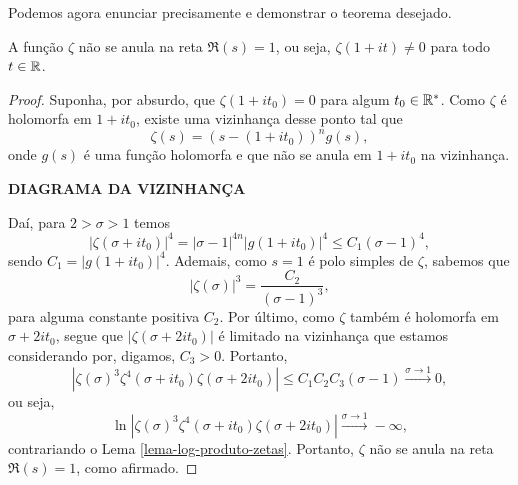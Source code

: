     \medskip
    
    
    Podemos agora enunciar precisamente e demonstrar o teorema desejado.
    \begin{teorema}
    \label{teo-zeta-nao-nula-re1}
        A função $\zeta$ não se anula na reta $\Re(s) = 1$, ou seja,
        $\zeta(1 + it) \neq 0$ para todo $t\in\mathbb{R}$.
    \end{teorema}
    \begin{proof}
        Suponha, por absurdo, que $\zeta(1 + it_0) = 0$ para algum 
        $t_0\in\mathbb{R}^*$. Como $\zeta$ é holomorfa em $1 + it_0$, existe
        uma vizinhança desse ponto tal que
        \[
        \zeta(s) = (s - (1 + it_0))^n g(s),
        \]
        onde $g(s)$ é uma função holomorfa e que não se anula em $1 + it_0$
        na vizinhança. 
        \begin{center}
            {\bf DIAGRAMA DA VIZINHANÇA}
        \end{center}
        Daí, para $2 > \sigma > 1$ temos
        \[
        |\zeta(\sigma + it_0)|^4 = |\sigma-1|^{4n}|g(1 + it_0)|^4
                                 \leq C_1(\sigma-1)^4,
        \]
        sendo $C_1 = |g(1+it_0)|^4$. Ademais, como $s=1$ é polo simples
        de $\zeta$, sabemos que
        \[
        |\zeta(\sigma)|^3 = \frac{C_2}{(\sigma - 1)^3},
        \]
        para alguma constante positiva $C_2$. Por último, como $\zeta$ 
        também é holomorfa em $\sigma + 2it_0$, segue que
        $|\zeta(\sigma + 2it_0)|$ é limitado na vizinhança que estamos
        considerando por, digamos, $C_3 > 0$. Portanto,
        \[
        |\zeta(\sigma)^3\zeta^4(\sigma + it_0)\zeta(\sigma + 2it_0)|
        \leq C_1C_2C_3(\sigma - 1) \xrightarrow{\sigma\to 1} 0,
        \]
        ou seja,
        \[
        \ln|\zeta(\sigma)^3\zeta^4(\sigma + it_0)\zeta(\sigma + 2it_0)| 
        \xrightarrow{\sigma\to 1} -\infty,
        \]
        contrariando o Lema \ref{lema-log-produto-zetas}. Portanto,
        $\zeta$ não se anula na reta $\Re(s) = 1$, como afirmado.
    \end{proof}
